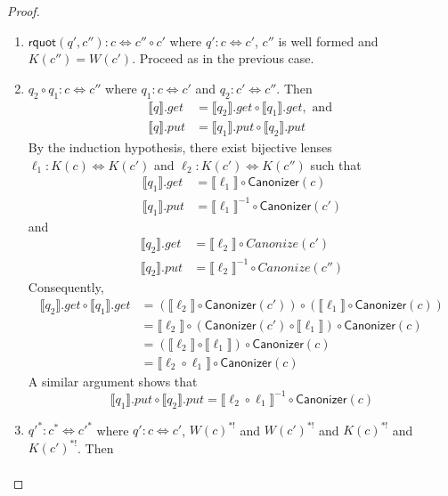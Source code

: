 \documentclass[acmsmall,review,anonymous]{acmart}\settopmatter{printfolios=true,printccs=false,printacmref=false}
\newcommand{\kw}[1]{\ensuremath{\mathsf{#1}}}
\newcommand{\canonizer}{\ensuremath{\kw{Canonizer}}}
\begin{document}
\begin{proof}
\begin{enumerate}
\item
$\kw{rquot}(q', c''):c \Leftrightarrow c'' \circ c'$ where $q' : c \Leftrightarrow
c'$, $c''$ is well formed and $K(c'') = W(c')$. Proceed as in the previous
case.
\item
$q_2 \circ q_1: c \Leftrightarrow c''$ where $q_1 : c \Leftrightarrow c'$ and
$q_2 : c' \Leftrightarrow c''$. Then
\begin{align*}
\llbracket q \rrbracket.get &= \llbracket q_2 \rrbracket.get\circ \llbracket
q_1 \rrbracket.get, \text{ and }\\
\llbracket q \rrbracket.put &= \llbracket q_1 \rrbracket.put \circ \llbracket
q_2 \rrbracket.put
\end{align*}
By the induction hypothesis, there exist bijective lenses
$\ell_1 :
K(c) \Leftrightarrow K(c')$ and $\ell_2 : K(c') \Leftrightarrow K(c'')$ such
that
\begin{align*}
\llbracket q_1 \rrbracket.get &= \llbracket \ell_1 \rrbracket \circ
\canonizer(c)\\
\llbracket q_1 \rrbracket.put &= {\llbracket \ell_1 \rrbracket}^{-1} \circ
\canonizer(c')
\end{align*}
and
\begin{align*}
\llbracket q_2 \rrbracket.get &= \llbracket \ell_2 \rrbracket \circ
Canonize(c')\\
\llbracket q_2 \rrbracket.put &= {\llbracket \ell_2 \rrbracket}^{-1} \circ
Canonize(c'')
\end{align*}
Consequently,
\begin{align*}
\llbracket q_2 \rrbracket.get \circ \llbracket q_1 \rrbracket.get &=
(\llbracket \ell_2 \rrbracket \circ \canonizer(c')) \circ (\llbracket \ell_1
\rrbracket \circ \canonizer(c))\\
&= \llbracket \ell_2 \rrbracket \circ (\canonizer(c') \circ \llbracket \ell_1
\rrbracket) \circ \canonizer(c)\\
&= (\llbracket \ell_2 \rrbracket \circ \llbracket \ell_1 \rrbracket) \circ
\canonizer(c)\\
&= \llbracket \ell_2  \circ  \ell_1 \rrbracket \circ
\canonizer(c)
\end{align*}
A similar argument shows that
$$\llbracket q_1 \rrbracket.put \circ \llbracket q_2 \rrbracket.put =
\llbracket \ell_2  \circ  \ell_1 \rrbracket^{-1} \circ
\canonizer(c)$$
\item
${q'}^* : c^* \Leftrightarrow {c'}^*$ where $q' : c \Leftrightarrow c'$,
$W(c)^{*!}$ and $W(c')^{*!}$ and $K(c)^{*!}$ and $K(c')^{*!}$. Then
\begin{align*}

\end{align*}
\end{enumerate}
\end{proof}
\end{document}
